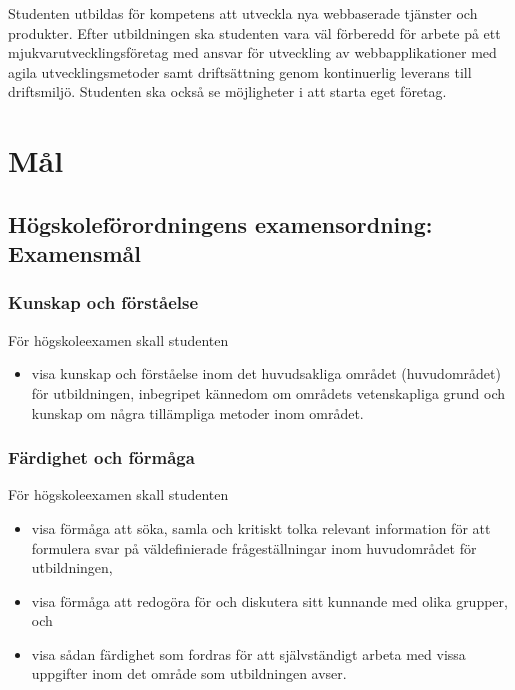 \documentclass[swedish]{LnuCmThesis}
\begin{document}
Studenten utbildas för kompetens att utveckla nya webbaserade tjänster och produkter. Efter utbildningen ska studenten vara väl förberedd för arbete på ett mjukvarutvecklingsföretag med ansvar för utveckling av webbapplikationer med agila utvecklingsmetoder samt driftsättning genom kontinuerlig leverans till driftsmiljö. Studenten ska också se möjligheter i att starta eget företag. 

\section*{Mål}

\subsection*{Högskoleförordningens examensordning: Examensmål}

\subsubsection*{Kunskap och förståelse}

För högskoleexamen skall studenten

\begin{itemize}
    \item visa kunskap och förståelse inom det huvudsakliga området (huvudområdet) för utbildningen, inbegripet kännedom om områdets vetenskapliga grund och kunskap om några tillämpliga metoder inom området.
\end{itemize}

\subsubsection*{Färdighet och förmåga}

För högskoleexamen skall studenten

\begin{itemize}
    \item visa förmåga att söka, samla och kritiskt tolka relevant information för att formulera svar på väldefinierade frågeställningar inom huvudområdet för utbildningen,
    \item visa förmåga att redogöra för och diskutera sitt kunnande med olika grupper, och
    \item visa sådan färdighet som fordras för att självständigt arbeta med vissa uppgifter inom det område som utbildningen avser.
\end{itemize}
\end{document}
